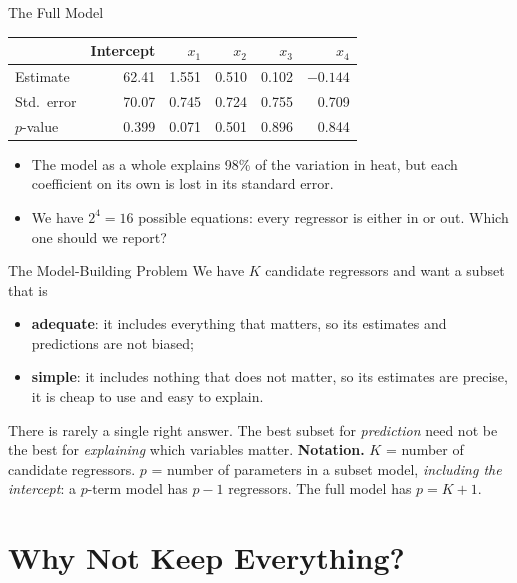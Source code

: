\begin{frame}{The Full Model}
    \begin{center}
        \small
        \begin{tabular}{lrrrrr}
            \toprule
            & Intercept & $x_1$ & $x_2$ & $x_3$ & $x_4$ \\
            \midrule
            Estimate & 62.41 & 1.551 & 0.510 & 0.102 & $-0.144$ \\
            Std.\ error & 70.07 & 0.745 & 0.724 & 0.755 & 0.709 \\
            $p$-value & 0.399 & 0.071 & 0.501 & 0.896 & 0.844 \\
            \bottomrule
        \end{tabular}
    \end{center}
    \begin{itemize}
        \item The model as a whole explains 98\% of the variation in heat, but each coefficient on its own is lost in its standard error.
        \item We have $2^4=16$ possible equations: every regressor is either in or out. Which one should we report?
    \end{itemize}
\end{frame}


\begin{frame}{The Model-Building Problem}
    We have $K$ candidate regressors and want a subset that is
    \begin{itemize}
        \item \textbf{adequate}: it includes everything that matters, so its estimates and predictions are not biased;
        \item \textbf{simple}: it includes nothing that does not matter, so its estimates are precise, it is cheap to use and easy to explain.
    \end{itemize}
    \svspace{0.5em}
    There is rarely a single right answer. The best subset for \emph{prediction} need not be the best for \emph{explaining} which variables matter.
    \svspace{0.5em}
    \textbf{Notation.} $K$ = number of candidate regressors. $p$ = number of parameters in a subset model, \emph{including the intercept}: a $p$-term model has $p-1$ regressors. The full model has $p=K+1$.
\end{frame}


\section{Why Not Keep Everything?}



